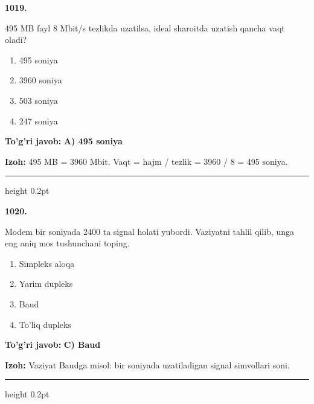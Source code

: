 \documentclass[10pt,a4paper,oneside]{article}
\begin{document}
\noindent\textbf{\color{ink}1019.}
\par
495 MB fayl 8 Mbit/s tezlikda uzatilsa, ideal sharoitda uzatish qancha vaqt oladi?
\begin{enumerate}[label=\Alph*),leftmargin=9mm]
\item 495 soniya
\item 3960 soniya
\item 503 soniya
\item 247 soniya
\end{enumerate}
\begin{tcolorbox}[enhanced,breakable,colback=teal!4,colframe=teal!50!black,boxrule=0.5pt,arc=1.1mm,left=3mm,right=3mm,top=1.7mm,bottom=1.7mm,before skip=2mm,after skip=2mm]
\textbf{\color{teal}To'g'ri javob:} \textbf{A) 495 soniya}
\par\smallskip
\textbf{Izoh:} 495 MB = 3960 Mbit. Vaqt = hajm / tezlik = 3960 / 8 = 495 soniya.
\end{tcolorbox}
\vspace{2mm}\hrule height 0.2pt \vspace{3mm}

\noindent\textbf{\color{ink}1020.}
\par
Modem bir soniyada 2400 ta signal holati yubordi. Vaziyatni tahlil qilib, unga eng aniq mos tushunchani toping.
\begin{enumerate}[label=\Alph*),leftmargin=9mm]
\item Simpleks aloqa
\item Yarim dupleks
\item Baud
\item To'liq dupleks
\end{enumerate}
\begin{tcolorbox}[enhanced,breakable,colback=teal!4,colframe=teal!50!black,boxrule=0.5pt,arc=1.1mm,left=3mm,right=3mm,top=1.7mm,bottom=1.7mm,before skip=2mm,after skip=2mm]
\textbf{\color{teal}To'g'ri javob:} \textbf{C) Baud}
\par\smallskip
\textbf{Izoh:} Vaziyat Baudga misol: bir soniyada uzatiladigan signal simvollari soni.
\end{tcolorbox}
\vspace{2mm}\hrule height 0.2pt \vspace{3mm}
\end{document}
